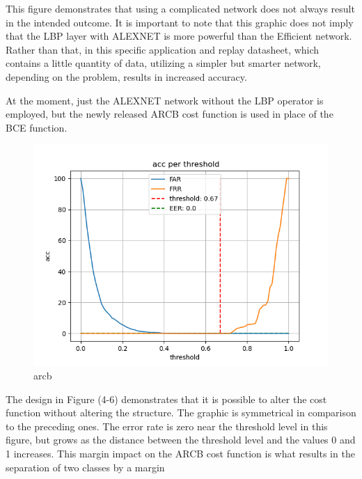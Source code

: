 \documentclass[journal]{IEEEtran}
\begin{document}
This figure demonstrates that using a complicated network does not always result in the intended outcome.
It is important to note that this graphic does not imply that the LBP layer with ALEXNET is more powerful than the Efficient network. Rather than that, in this specific application and replay datasheet, which contains a little quantity of data, utilizing a simpler but smarter network, depending on the problem, results in increased accuracy.

At the moment, just the ALEXNET network without the LBP operator is employed, but the newly released ARCB cost function is used in place of the BCE function.

\begin{figure}[h]
	\centerline{\includegraphics[width=\linewidth]{eer-arcb}}
	\caption{arcb}
	\label{fig:eer-arcb}
\end{figure}

The design in Figure (4-6) demonstrates that it is possible to alter the cost function without altering the structure. The graphic is symmetrical in comparison to the preceding ones. The error rate is zero near the threshold level in this figure, but grows as the distance between the threshold level and the values 0 and 1 increases. This margin impact on the ARCB cost function is what results in the separation of two classes by a margin
\end{document}
